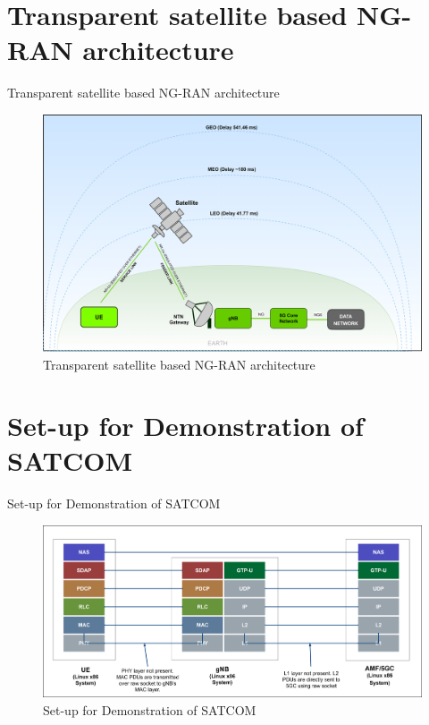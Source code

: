 \documentclass{beamer}
\begin{document}
\section{Transparent satellite based NG-RAN architecture}
\begin{frame}{Transparent satellite based NG-RAN architecture}
    \begin{figure}[h!]
  		\centering
  		\includegraphics[width=\linewidth]{./figs/SATCOM_figure.png}
  		\caption{Transparent satellite based NG-RAN architecture}
  		\label{SATCOM_figure}
	\end{figure}
  
\end{frame} 


\section{Set-up for Demonstration of SATCOM}
\begin{frame}{Set-up for Demonstration of SATCOM}
    \begin{figure}[h!]
  		\centering
  		\includegraphics[width=\linewidth]{./figs/SATCOM_setup.png}
  		\caption{Set-up for Demonstration of SATCOM}
  		\label{SATCOM_setup}
	\end{figure}
\end{frame} 
\end{document}

